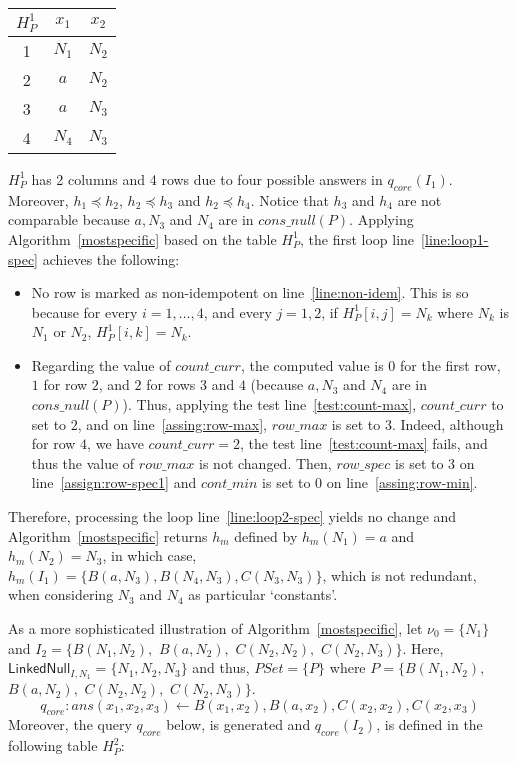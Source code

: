 \begin{example}
    \begin{center}
        \begin{tabular}{c|cc}
            $H_P^1$ & $x_1$  & $x_2$  \\ \hline
            1       & $N_1 $ & $N_2$  \\
            2       & $a$    & $N_2$  \\
            3       & $a$    & $ N_3$ \\
            4       & $N_4$  & $ N_3$ \\
        \end{tabular}
    \end{center}

    $H_P^1$ has 2 columns and 4 rows due to four possible answers in $q_{core}(I_1)$.
    Moreover, $h_1 \preceq h_2$, $h_2 \preceq h_3$ and $h_2 \preceq h_4$.
    Notice that $h_3$ and $h_4$ are not comparable because $a, N_3$ and $N_4$ are in $cons\_null(P)$.
    Applying Algorithm~\ref{mostspecific} based on the table $H_P^1$, the first loop line~\ref{line:loop1-spec} achieves the following:
    \begin{itemize}
        \item
              No row is marked as non-idempotent on line~\ref{line:non-idem}.
              This is so because for every $i=1, \ldots, 4$, and every $j=1,2$, if $H^1_P[i,j]=N_k$ where $N_k$ is $N_1$ or $N_2$, $H^1_P[i,k]=N_k$.
        \item Regarding the value of $count\_curr$, the computed value is $0$ for the first row, $1$ for row $2$, and $2$ for rows $3$ and $4$ (because $a, N_3$ and $N_4$ are in $cons\_null(P)$).
              Thus, applying the test line~\ref{test:count-max}, $count\_curr$ to set to $2$, and on line~\ref{assing:row-max}, $row\_max$ is set to $3$.
              Indeed, although for row $4$, we have $count\_curr = 2$, the test line~\ref{test:count-max} fails, and thus the value of $row\_max$ is not changed.
              Then, $row\_spec$ is set to $3$ on line~\ref{assign:row-spec1} and $cont\_min$ is set to $0$ on line~\ref{assing:row-min}.
    \end{itemize}
    Therefore, processing the loop line~\ref{line:loop2-spec} yields no change and Algorithm~\ref{mostspecific} returns $h_m$ defined by $h_m(N_1)=a$ and $h_m(N_2)=N_3$, in which case, $h_m(I_1)=\{B(a, N_3), B(N_4,N_3), C(N_3,N_3)\}$, which is not redundant, when considering $N_3$ and $N_4$ as particular `constants'.

    As a more sophisticated illustration of Algorithm~\ref{mostspecific}, let $\nu_0=\{N_1\}$ and $I_2= \{B(N_1, N_2),$ $B(a, N_2),$ $C(N_2,N_2),$ $C(N_2,N_3)\}$.
    Here, $\textsf{LinkedNull}_{I,N_1}=\{N_1,N_2, N_3\}$ and thus, $PSet = \{P\}$ where $P=\{B(N_1, N_2),$ $B(a,N_2),$ $C(N_2,N_2),$ $C(N_2,N_3)\}$.
    \[
        q_{core}:ans(x_1,x_2,x_3) \leftarrow B(x_1, x_2), B(a,x_2),C(x_2,x_2),C(x_2,x_3)
    \]
    Moreover, the query $q_{core}$ below, is generated and $q_{core}(I_2)$, is defined in the following table $H^2_P$:


\end{example}
